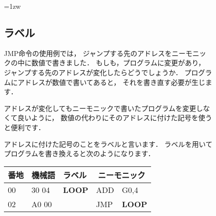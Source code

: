 \begin{figure}[btp]
\begin{framed}{\parindent=1zw
\subsection*{ラベル}
JMP命令の使用例では，
ジャンプする先のアドレスをニーモニックの中に数値で書きました．
もしも，プログラムに変更があり，
ジャンプする先のアドレスが変化したらどうでしょうか．
プログラムにアドレスが数値で書いてあると，
それを書き直す必要が生じます．

アドレスが変化してもニーモニックで書いたプログラムを変更しなくて良いように，
数値の代わりにそのアドレスに付けた記号を使うと便利です．

アドレスに付けた記号のことをラベルと言います．
ラベルを用いてプログラムを書き換えると次のようになります．

{\tt\small\begin{center}
\begin{tabular}{|l|l|l|l l|} \hline
番地 & 機械語 & ラベル & \multicolumn{2}{|c|}{ニーモニック} \\
\hline
00 & 30 04 & {\bf LOOP} & ADD  & G0,4          \\
02 & A0 00 &            & JMP  & {\bf LOOP}    \\
\hline
\end{tabular}
\end{center}}
}\end{framed}
\end{figure}

